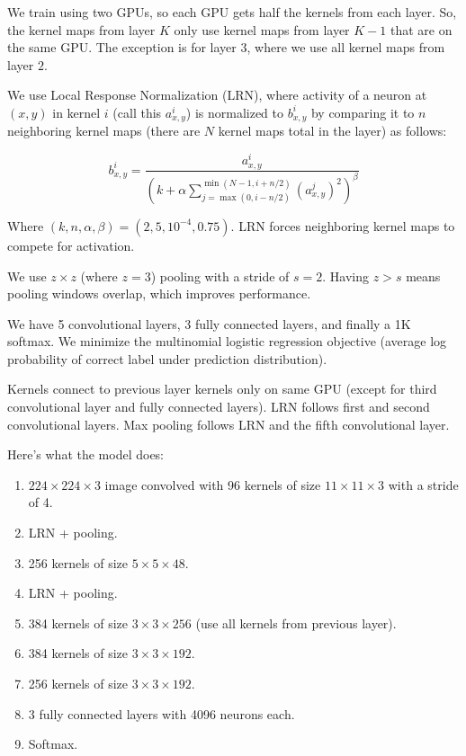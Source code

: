 \documentclass[a4paper]{article}
\begin{document}
We train using two GPUs, so each GPU gets half the kernels from each layer. So,
the kernel maps from layer $K$ only use kernel maps from layer $K-1$ that are on
the same GPU. The exception is for layer $3$, where we use all kernel maps from
layer $2$.

We use Local Response Normalization (LRN), where activity of a neuron at
$(x, y)$ in kernel $i$ (call this $a_{x, y}^{i}$) is normalized to
$b_{x, y}^{i}$ by comparing it to $n$ neighboring kernel maps (there are $N$
kernel maps total in the layer) as follows:

\begin{equation}
b_{x, y}^{i} = \frac{
  a_{x, y}^{i}
}{
  (
    k + \alpha \sum_{j=\max(0, i - n/2)}^{\min(N-1, i + n/2)}{(a_{x, y}^j)^2}
  )^\beta
}
\end{equation}

Where $(k, n, \alpha, \beta) = (2, 5, 10^{-4}, 0.75)$. LRN forces neighboring
kernel maps to compete for activation.

We use $z \times z$ (where $z = 3$) pooling with a stride of $s = 2$. Having
$z > s$ means pooling windows overlap, which improves performance.

We have 5 convolutional layers, 3 fully connected layers, and finally a 1K
softmax. We minimize the multinomial logistic regression objective (average
log probability of correct label under prediction distribution).

Kernels connect to previous layer kernels only on same GPU (except for third
convolutional layer and fully connected layers). LRN follows first and second
convolutional layers. Max pooling follows LRN and the fifth convolutional layer.

Here's what the model does:

\begin{enumerate}
  \item $224 \times 224 \times 3$ image convolved with 96 kernels of size
  $11 \times 11 \times 3$ with a stride of 4.
  \item LRN + pooling.
  \item 256 kernels of size $5 \times 5 \times 48$.
  \item LRN + pooling.
  \item 384 kernels of size $3 \times 3 \times 256$
  (use all kernels from previous layer).
  \item 384 kernels of size $3 \times 3 \times 192$.
  \item 256 kernels of size $3 \times 3 \times 192$.
  \item 3 fully connected layers with 4096 neurons each.
  \item Softmax.
\end{enumerate}
\end{document}
